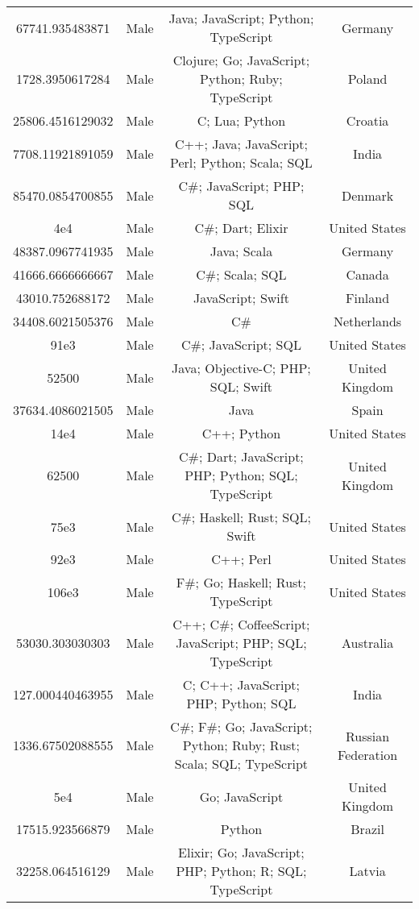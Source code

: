 \begin{center}
\begin{tabular}{ |c|c|c|c| }
67741.935483871  &  Male  &  Java; JavaScript; Python; TypeScript  &  Germany  \\ 
1728.3950617284  &  Male  &  Clojure; Go; JavaScript; Python; Ruby; TypeScript  &  Poland  \\ 
25806.4516129032  &  Male  &  C; Lua; Python  &  Croatia  \\ 
7708.11921891059  &  Male  &  C++; Java; JavaScript; Perl; Python; Scala; SQL  &  India  \\ 
85470.0854700855  &  Male  &  C\#; JavaScript; PHP; SQL  &  Denmark  \\ 
4e4  &  Male  &  C\#; Dart; Elixir  &  United States  \\ 
48387.0967741935  &  Male  &  Java; Scala  &  Germany  \\ 
41666.6666666667  &  Male  &  C\#; Scala; SQL  &  Canada  \\ 
43010.752688172  &  Male  &  JavaScript; Swift  &  Finland  \\ 
34408.6021505376  &  Male  &  C\#  &  Netherlands  \\ 
91e3  &  Male  &  C\#; JavaScript; SQL  &  United States  \\ 
52500  &  Male  &  Java; Objective-C; PHP; SQL; Swift  &  United Kingdom  \\ 
37634.4086021505  &  Male  &  Java  &  Spain  \\ 
14e4  &  Male  &  C++; Python  &  United States  \\ 
62500  &  Male  &  C\#; Dart; JavaScript; PHP; Python; SQL; TypeScript  &  United Kingdom  \\ 
75e3  &  Male  &  C\#; Haskell; Rust; SQL; Swift  &  United States  \\ 
92e3  &  Male  &  C++; Perl  &  United States  \\ 
106e3  &  Male  &  F\#; Go; Haskell; Rust; TypeScript  &  United States  \\ 
53030.303030303  &  Male  &  C++; C\#; CoffeeScript; JavaScript; PHP; SQL; TypeScript  &  Australia  \\ 
127.000440463955  &  Male  &  C; C++; JavaScript; PHP; Python; SQL  &  India  \\ 
1336.67502088555  &  Male  &  C\#; F\#; Go; JavaScript; Python; Ruby; Rust; Scala; SQL; TypeScript  &  Russian Federation  \\ 
5e4  &  Male  &  Go; JavaScript  &  United Kingdom  \\ 
17515.923566879  &  Male  &  Python  &  Brazil  \\ 
32258.064516129  &  Male  &  Elixir; Go; JavaScript; PHP; Python; R; SQL; TypeScript  &  Latvia  \\ 

\end{tabular}
\end{center}
